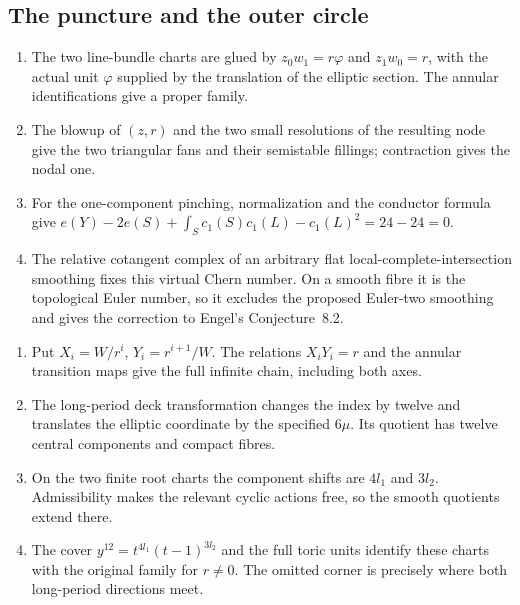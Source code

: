 \subsection{The puncture and the outer circle}
\RungOne
\begin{enumerate}[label=\arabic*.]
\item The two line-bundle charts are glued by
$z_0w_1=r\varphi$ and $z_1w_0=r$, with the actual unit
$\varphi$ supplied by the translation of the elliptic
section. The annular identifications give a proper family.
\item The blowup of $(z,r)$ and the two small resolutions
of the resulting node give the two triangular fans and
their semistable fillings; contraction gives the nodal one.
\item For the one-component pinching, normalization and the
conductor formula give
$e(Y)-2e(S)+\int_S c_1(S)c_1(L)-c_1(L)^2=24-24=0$.
\item The relative cotangent complex of an arbitrary flat
local-complete-intersection smoothing fixes this virtual
Chern number. On a smooth fibre it is the topological
Euler number, so it excludes the proposed Euler-two
smoothing and gives the correction to Engel's Conjecture~8.2.
\end{enumerate}

\RungOne
\begin{enumerate}[label=\arabic*.]
\item Put $X_i=W/r^i$, $Y_i=r^{i+1}/W$.
The relations $X_iY_i=r$ and the annular transition
maps give the full infinite chain, including both axes.
\item The long-period deck transformation changes the
index by twelve and translates the elliptic coordinate
by the specified $6\mu$. Its quotient has twelve
central components and compact fibres.
\item On the two finite root charts the component shifts
are $4l_1$ and $3l_2$. Admissibility makes the relevant
cyclic actions free, so the smooth quotients extend there.
\item The cover $y^{12}=t^{4l_1}(t-1)^{3l_2}$ and the
full toric units identify these charts with the original
family for $r\ne0$. The omitted corner is precisely
where both long-period directions meet.
\end{enumerate}

